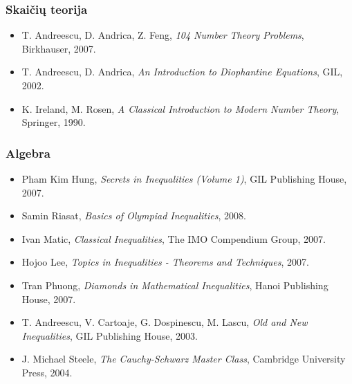\subsubsection{Skaičių teorija}

\begin{itemize}
  \item T. Andreescu, D. Andrica, Z. Feng, \emph{104 Number Theory
    Problems}, Birkhauser, 2007.
  \item T. Andreescu, D. Andrica, \emph{An Introduction to Diophantine
    Equations}, GIL, 2002.
  \item K. Ireland, M. Rosen, \emph{A Classical Introduction to Modern
    Number Theory}, Springer, 1990.
\end{itemize}

\subsubsection{Algebra}

\begin{itemize}
  \item Pham Kim Hung, \emph{Secrets in Inequalities (Volume 1)}, GIL
    Publishing House, 2007.
  \item Samin Riasat, \emph{Basics of Olympiad Inequalities}, 2008.
  \item Ivan Matic, \emph{Classical Inequalities}, The IMO Compendium
    Group, 2007.
  \item Hojoo Lee, \emph{Topics in Inequalities - Theorems and
    Techniques}, 2007.
  \item Tran Phuong, \emph{Diamonds in Mathematical Inequalities},
    Hanoi Publishing House, 2007.
  \item T. Andreescu, V. Cartoaje, G. Dospinescu, M. Lascu, \emph{Old
    and New Inequalities}, GIL Publishing House, 2003.
  \item J. Michael Steele, \emph{The Cauchy-Schwarz Master Class},
    Cambridge University Press, 2004.
\end{itemize}

